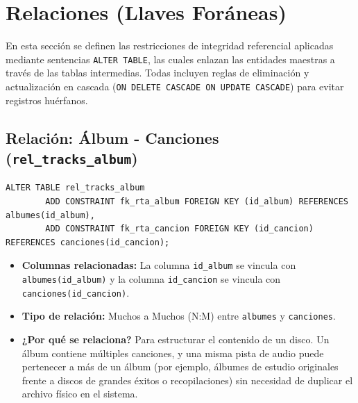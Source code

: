 \documentclass[11pt]{article}
\begin{document}
	\section{Relaciones (Llaves Foráneas)}
	
	En esta sección se definen las restricciones de integridad referencial aplicadas mediante sentencias \texttt{ALTER TABLE}, las cuales enlazan las entidades maestras a través de las tablas intermedias. Todas incluyen reglas de eliminación y actualización en cascada (\texttt{ON DELETE CASCADE ON UPDATE CASCADE}) para evitar registros huérfanos.
	
	\subsection{Relación: Álbum - Canciones (\texttt{rel\_tracks\_album})}
	\begin{lstlisting}[style=sqlstyle]
		ALTER TABLE rel_tracks_album
		ADD CONSTRAINT fk_rta_album FOREIGN KEY (id_album) REFERENCES albumes(id_album),
		ADD CONSTRAINT fk_rta_cancion FOREIGN KEY (id_cancion) REFERENCES canciones(id_cancion);
	\end{lstlisting}
	\begin{itemize}[noitemsep,topsep=2pt]
		\item \textbf{Columnas relacionadas:} La columna \texttt{id\_album} se vincula con \texttt{albumes(id\_album)} y la columna \texttt{id\_cancion} se vincula con \texttt{canciones(id\_cancion)}.
		\item \textbf{Tipo de relación:} Muchos a Muchos (N:M) entre \texttt{albumes} y \texttt{canciones}.
		\item \textbf{¿Por qué se relaciona?} Para estructurar el contenido de un disco. Un álbum contiene múltiples canciones, y una misma pista de audio puede pertenecer a más de un álbum (por ejemplo, álbumes de estudio originales frente a discos de grandes éxitos o recopilaciones) sin necesidad de duplicar el archivo físico en el sistema.
	\end{itemize}
	
	\vspace{0.5cm}
	
\end{document}
